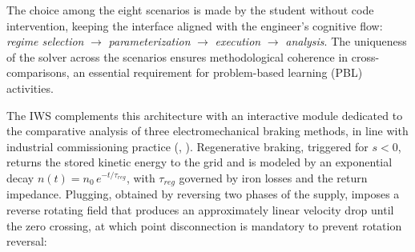 \documentclass[a4paper]{ifacconf}
\begin{document}
\begin{table}[htbp]
\centering
\caption{Unified experimental scenarios within the IWS.}
\label{tab:cenarios_en}
\end{table}

The choice among the eight scenarios is made by the student without code intervention, keeping the interface aligned with the engineer's cognitive flow: \textit{regime selection} $\rightarrow$ \textit{parameterization} $\rightarrow$ \textit{execution} $\rightarrow$ \textit{analysis}. The uniqueness of the solver across the scenarios ensures methodological coherence in cross-comparisons, an essential requirement for problem-based learning (PBL) activities.

The IWS complements this architecture with an interactive module dedicated to the comparative analysis of three electromechanical braking methods, in line with industrial commissioning practice (\citeauthor{ikeda2007simulation}, \citeyear{ikeda2007simulation}). Regenerative braking, triggered for $s < 0$, returns the stored kinetic energy to the grid and is modeled by an exponential decay $n(t) = n_0\,e^{-t/\tau_{reg}}$, with $\tau_{reg}$ governed by iron losses and the return impedance. Plugging, obtained by reversing two phases of the supply, imposes a reverse rotating field that produces an approximately linear velocity drop until the zero crossing, at which point disconnection is mandatory to prevent rotation reversal:
\end{document}
